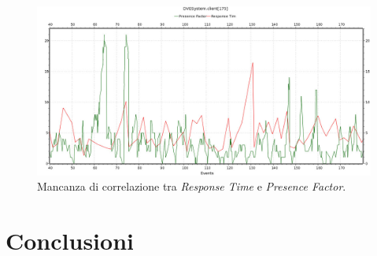 \documentclass[a4paper, 11pt, oneside]{book}
\theoremstyle{definition}
\theoremstyle{remark}
\begin{document}
\begin{figure}
\begin{center}
\includegraphics[scale=0.4]{responseVSpresence.jpeg}
\end{center}
\caption{Mancanza di correlazione tra \emph{Response Time} e
\emph{Presence Factor}.}
\label{responseVSPresence}
\end{figure}

\chapter{Conclusioni}\label{conclusioni}



\end{document}
